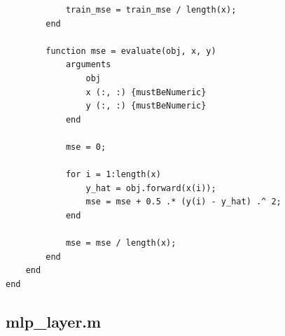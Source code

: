 \documentclass[11pt,pdftex,portrait,letterpaper]{article}
\begin{document}
\begin{lstlisting}
            train_mse = train_mse / length(x);
        end
        
        function mse = evaluate(obj, x, y)
            arguments
                obj
                x (:, :) {mustBeNumeric}
                y (:, :) {mustBeNumeric}
            end

            mse = 0;

            for i = 1:length(x)
                y_hat = obj.forward(x(i));
                mse = mse + 0.5 .* (y(i) - y_hat) .^ 2;
            end

            mse = mse / length(x);
        end
    end
end
\end{lstlisting}

\newpage
\subsection{mlp\_layer.m} \label{sec:appMlpLayer}
\end{document}
